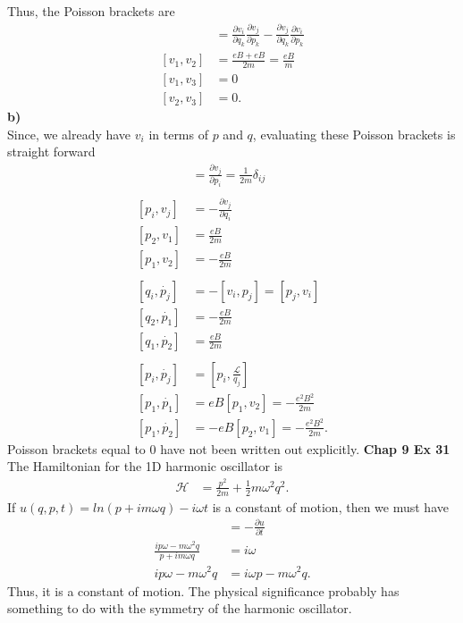 \documentclass[10pt]{article}
\begin{document}
Thus, the Poisson brackets are
\begin{align*}
  [v_i,v_j] &= \frac{\partial v_i}{\partial q_k}\frac{\partial v_j}{\partial p_k} - \frac{\partial v_j}{\partial q_k}\frac{\partial v_i}{\partial p_k}\\
  [v_1,v_2] &= \frac{eB+eB}{2m}=\frac{eB}{m}\\
  [v_1,v_3] &= 0\\
  [v_2,v_3] &= 0.
\end{align*}
\textbf{b)}\\
Since, we already have $v_i$ in terms of $p$ and $q$, evaluating these
Poisson brackets is straight forward
\begin{align*}
  [q_i,v_j] &= \frac{\partial v_j}{\partial p_i} = \frac{1}{2m}\delta_{ij}\\
  \\
  [p_i,v_j] &= -\frac{\partial v_j}{\partial q_i}\\
  [p_2,v_1] &= \frac{eB}{2m}\\
  [p_1,v_2] &= -\frac{eB}{2m}\\
  \\
  [q_i,\dot{p_j}] &= -[v_i,p_j] = [p_j,v_i]\\
  [q_2,\dot{p_1}] &= -\frac{eB}{2m}\\
  [q_1,\dot{p_2}] &= \frac{eB}{2m}\\
  \\
  [p_i,\dot{p_j}] &= [p_i,\frac{\mathcal{L}}{q_j}]\\
  [p_1,\dot{p_1}] &= eB[p_1,v_2] = -\frac{e^2B^2}{2m}\\
  [p_1,\dot{p_2}] &= -eB[p_2,v_1] = -\frac{e^2B^2}{2m}.
\end{align*}
Poisson brackets equal to 0 have not been written out explicitly.
\textbf{Chap 9 Ex 31}\\
The Hamiltonian for the 1D harmonic oscillator is
\begin{align*}
  \mathcal{H} &= \frac{p^2}{2m}+\frac{1}{2}m\omega^2q^2.
\end{align*}
If $u(q,p,t)=ln(p+im\omega q)-i\omega t$ is a constant of motion, then we must have
\begin{align*}
  [u,\mathcal{H}] &= -\frac{\partial u}{\partial t}\\
  \frac{ip\omega-m\omega^2q}{p+im\omega q} &= i\omega\\
  ip\omega-m\omega^2q &= i\omega p-m\omega^2 q.
\end{align*}
Thus, it is a constant of motion.  The physical significance probably has 
something to do with the symmetry of the harmonic oscillator.
\end{document}
